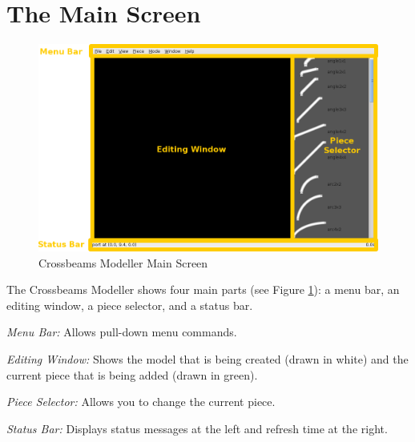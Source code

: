 \documentclass[12pt]{report}
\begin{document}
\section{The Main Screen}


\begin{figure}[h]
\begin{center}
\includegraphics[width=5.1in]{doc_images/manual_main_screen.png}
\caption{Crossbeams Modeller Main Screen}
\label{MainScreen}
\end{center}
\end{figure}

The Crossbeams Modeller shows four main parts (see Figure
\ref{MainScreen}): a menu bar, an editing window, a piece selector, and
a status bar.

\begin{list}{}{}
  \item \emph{Menu Bar:} Allows pull-down menu commands.
  \item \emph{Editing Window:} Shows the model that is being created (drawn in white) and the current piece that is being added (drawn in green).
  \item \emph{Piece Selector:} Allows you to change the current piece.
  \item \emph{Status Bar:} Displays status messages at the left and refresh time at the right.
\end{list}
\end{document}
